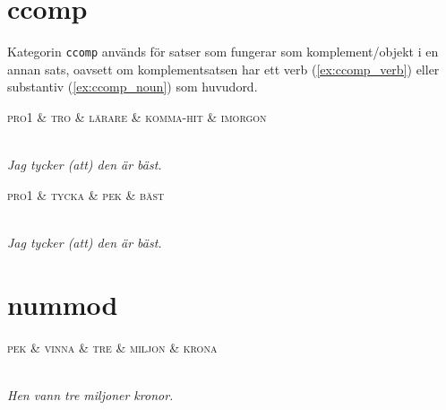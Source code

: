 \documentclass[11pt,a4paper]{article}
\begin{document}
\section{ccomp}
Kategorin \texttt{ccomp} används för satser som fungerar som komplement/objekt i en annan sats, oavsett om komplementsatsen har ett verb (\ref{ex:ccomp_verb}) eller substantiv (\ref{ex:ccomp_noun}) som huvudord.

\begin{example}
\label{ex:ccomp_verb}
\begin{dependency}[theme = simple]
   \begin{deptext}[column sep=1em]
      \textsc{pro1} \& \textsc{tro} \& \textsc{lärare} \& \textsc{komma-hit} \& \textsc{imorgon} \\
   \end{deptext}
\end{dependency}
\\
\textit{Jag tycker (att) den är bäst.}
\end{example}

\begin{example}
\label{ex:ccomp_noun}
\begin{dependency}[theme = simple]
   \begin{deptext}[column sep=1em]
      \textsc{pro1} \& \textsc{tycka} \& \textsc{pek} \& \textsc{bäst} \\
   \end{deptext}
\end{dependency}
\\
\textit{Jag tycker (att) den är bäst.}
\end{example}


\section{nummod}

\begin{example}
\label{ex:nummod}
\begin{dependency}[theme = simple]
   \begin{deptext}[column sep=1em]
      \textsc{pek} \& \textsc{vinna} \& \textsc{tre} \& \textsc{miljon} \& \textsc{krona} \\
   \end{deptext}
\end{dependency}
\\
\textit{Hen vann tre miljoner kronor.}
\end{example}
\end{document}
